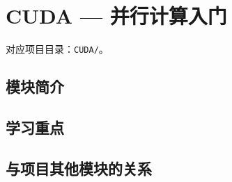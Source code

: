 \chapter{CUDA — 并行计算入门}

对应项目目录：\texttt{CUDA/}。

\section{模块简介}



\section{学习重点}



\section{与项目其他模块的关系}


